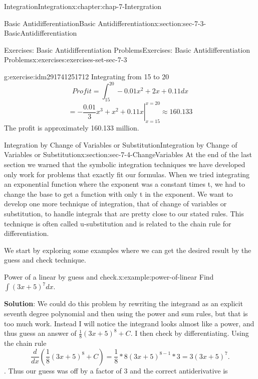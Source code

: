 \documentclass[oneside,10pt,]{book}
\newcommand{\terminology}[1]{\textbf{#1}}
\numberwithin{equation}{section}
\begin{document}
\begin{chapterptx}{Integration}{}{Integration}{}{}{x:chapter:chap-7-Intergration}
\begin{sectionptx}{Basic Antidifferentiation}{}{Basic Antidifferentiation}{}{}{x:section:sec-7-3-BasicAntidifferentiation}
\begin{exercises-subsection}{Exercises: Basic Antidifferentiation Problems}{}{Exercises: Basic Antidifferentiation Problems}{}{}{x:exercises:exercises-set-sec-7-3}
\begin{divisionexercise}{23}{}{}{g:exercise:idm291741251712}
Integrating from 15 to 20%
%
\begin{equation*}
Profit= \int_{15}^{20}-0.01x^2+2x+0.11  dx
\end{equation*}
%
\begin{equation*}
= \left.-\frac{0.01}{3} x^3+x^2+0.11x\right|_{x=15}^{x=20}
\approx 160.133
\end{equation*}
The profit is approximately \textdollar{}160.133 million.\end{divisionexercise}%
\end{exercises-subsection}
\end{sectionptx}
%
%
\typeout{************************************************}
\typeout{************************************************}
%
\begin{sectionptx}{Integration by Change of Variables or Substitution}{}{Integration by Change of Variables or Substitution}{}{}{x:section:sec-7-4-ChangeVariables}
At the end of the last section we warned that the symbolic integration techniques we have developed only work for problems that exactly fit our formulas.  When we tried integrating an exponential function where the exponent was a constant times t, we had to change the base to get a function with only t in the exponent.  We want to develop one more technique of integration, that of change of variables or substitution, to handle integrals that are pretty close to our stated rules. This technique is often called u-substitution and is related to the chain rule for differentiation.%
\par
We start by exploring some examples where we can get the desired result by the guess and check technique.%
\begin{example}{Power of a linear by guess and check.}{x:example:power-of-linear}%
Find \(\int (3x+5)^7  dx\).%
\par
\terminology{Solution}:  We could do this problem by rewriting the integrand as an explicit seventh degree polynomial and then using the power and sum rules, but that is too much work.  Instead I will notice the integrand looks almost like a power, and thus guess an answer of \(\frac{1}{8} (3x+5)^8+C\).  I then check by differentiating.  Using the chain rule%
%
\begin{equation*}
\frac{d}{dx}  (\frac{1}{8} (3x+5)^8+C)=\frac{1}{8}*8(3x+5)^{8-1}*3=3(3x+5)^7.
\end{equation*}
. Thus our guess was off by a factor of 3 and the correct antiderivative is%
%
\begin{equation*}

\end{equation*}
\end{example}
\end{sectionptx}
\end{chapterptx}
\end{document}
